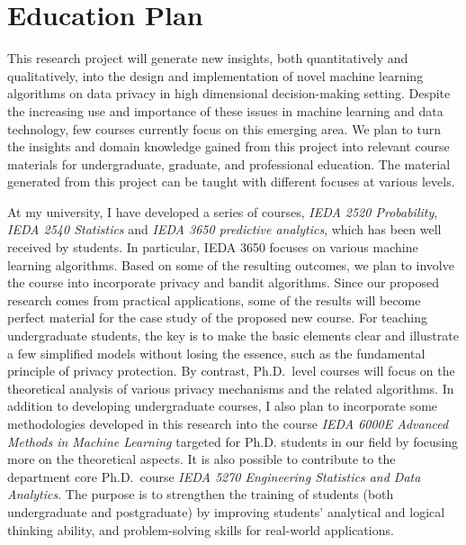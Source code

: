 \documentclass[12pt]{article}
\newcommand{\1}{\mathbf{1}}
\begin{document}
\section*{Education Plan}
\pagestyle{empty}
\begin{spacing}{1.32}

This research project will generate new insights, both quantitatively and qualitatively, into the design and implementation of novel machine learning algorithms on data privacy in high dimensional decision-making setting. Despite the increasing use and importance of these issues in machine learning and data technology, few courses currently focus on this emerging area. 
We plan to turn the insights and domain knowledge gained from this project into relevant course materials for undergraduate, graduate, and professional education.
The material generated from this project can be taught with different focuses at various levels. 

At my university, I have developed a series of courses, \emph{IEDA 2520 Probability}, \emph{IEDA 2540 Statistics} and \emph{IEDA 3650  predictive analytics}, which has been well received by students. 
In particular, IEDA 3650 focuses on various machine learning algorithms. 
Based on some of the resulting outcomes, we plan to involve the course into incorporate privacy and bandit algorithms.
Since our proposed research comes from practical applications, some of the results will become perfect material for the case study of the proposed new course.
For teaching undergraduate students, the key is to make the basic elements clear and illustrate a few simplified models without losing the essence, such as the fundamental principle of privacy protection. By contrast, Ph.D.\ level courses will focus on the theoretical analysis of various privacy mechanisms and the related algorithms.
In addition to developing undergraduate courses, I also plan to incorporate some methodologies developed in this research into the course \emph{IEDA 6000E Advanced Methods in Machine Learning} targeted for Ph.D. students in our field by focusing more on the theoretical aspects. 
It is also possible to contribute to the department core Ph.D.\ course \emph{IEDA 5270 Engineering Statistics and Data Analytics}. 
The purpose is to strengthen the training of students (both undergraduate and postgraduate) by improving students' analytical and logical thinking ability, and problem-solving skills for real-world applications. 


\end{spacing}
\end{document}
